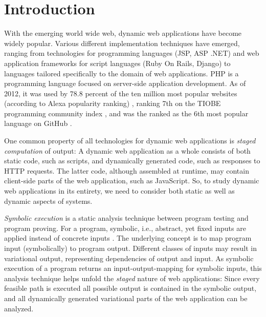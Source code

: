\documentclass[preprint]{sig-alternate-05-2015}
\begin{document}



%
%
\printccsdesc



\section{Introduction}
With the emerging world wide web, dynamic web applications have become
widely popular. Various different implementation techniques have emerged,
ranging from technologies for programming languages (JSP, ASP .NET) and web
application frameworks for  script languages (Ruby On Rails, Django) to
languages tailored specifically to the domain of web applications. PHP \cite{phpNET} is
a programming language focused on server-side application development. As of 2012,
it was used by 78.8 percent of the ten million most popular websites (according
to Alexa popularity ranking) \cite{alexaPHP}, ranking 7th on the TIOBE
programming community index \cite{tiobePHP}, and was the ranked as the 6th most
popular language on GitHub \cite{githubPHP}.

One common property of all technologies for dynamic web applications is \emph{staged computation} of output: A dynamic web application as a whole consists of both static code, such as scripts, and dynamically generated code, such as responses to HTTP requests. The latter code, although assembled at runtime, may contain client-side parts of the web application, such as JavaScript. So, to study dynamic web applications in its entirety, we need to consider both static as well as dynamic aspects of systems.


\emph{Symbolic execution} is a static analysis technique between program testing
and program proving. For a program, symbolic, i.e., abstract, yet fixed inputs are
applied instead of concrete inputs \cite{Darringer1978,King1976}. The underlying
concept is to map program input (symbolically) to program output. Different classes of inputs may
result in variational output, representing dependencies of output and input.
As symbolic execution of a program returns an input-output-mapping for symbolic
inputs, this analysis technique helps unfold the \emph{staged} nature of web
applications: Since every feasible path is executed all possible output is
contained in the symbolic output, and all dynamically generated variational
parts of the web application can be analyzed.
\end{document}
